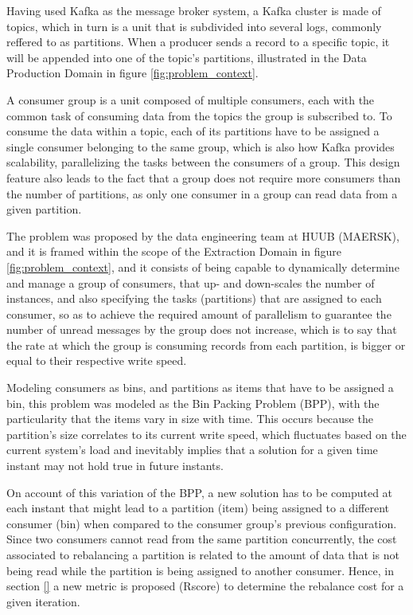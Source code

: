 Having used Kafka as the message broker system, a Kafka cluster is made of
topics, which in turn is a unit that is subdivided into several logs, commonly
reffered to as partitions. When a producer sends a record to a specific topic,
it will be appended into one of the topic's partitions, illustrated in the
Data Production Domain in figure \ref{fig:problem_context}. 

A consumer group is a unit composed of multiple consumers, each with the common
task of consuming data from the topics the group is subscribed to. To consume
the data within a topic, each of its partitions have to be assigned a single
consumer belonging to the same group, which is also how Kafka provides
scalability, parallelizing the tasks between the consumers of a group. This
design feature also leads to the fact that a group does not require more
consumers than the number of partitions, as only one consumer in a group can
read data from a given partition.

The problem was proposed by the data engineering team at HUUB (MAERSK), and it
is framed within the scope of the Extraction Domain in figure
\ref{fig:problem_context}, and it consists of being capable to dynamically
determine and manage a group of consumers, that up- and down-scales the
number of instances, and also specifying the tasks (partitions) that are assigned
to each consumer, so as to achieve the required amount of parallelism to
guarantee the number of unread messages by the group does not increase, which is
to say that the rate at which the group is consuming records from each
partition, is bigger or equal to their respective write speed.

Modeling consumers as bins, and partitions as items that have to be assigned a
bin, this problem was modeled as the Bin Packing Problem (BPP), with the
particularity that the items vary in size with time. This occurs because the
partition's size correlates to its current write speed, which fluctuates based
on the current system's load and inevitably implies that a solution for a given
time instant may not hold true in future instants. 

On account of this variation of the BPP, a new solution has to be computed at
each instant that might lead to a partition (item) being assigned to a different
consumer (bin) when compared to the consumer group's previous configuration.
Since two consumers cannot read from the same partition concurrently, the cost
associated to rebalancing a partition is related to the amount of data that is
not being read while the partition is being assigned to another consumer. Hence,
in section \ref{} a new metric is proposed (Rscore) to determine the rebalance
cost for a given iteration. 

